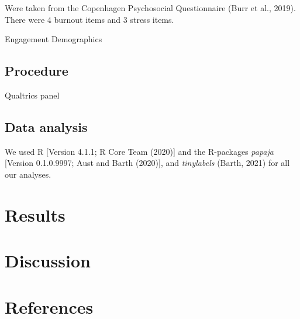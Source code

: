 \documentclass[
  english,
  man]{apa6}
\begin{document}
Were taken from the Copenhagen Psychosocial Questionnaire (Burr et al., 2019). There were 4 burnout items and 3 stress items.

Engagement
Demographics

\hypertarget{procedure}{%
\subsection{Procedure}\label{procedure}}

Qualtrics panel

\hypertarget{data-analysis}{%
\subsection{Data analysis}\label{data-analysis}}

We used R {[}Version 4.1.1; R Core Team (2020){]} and the R-packages \emph{papaja} {[}Version 0.1.0.9997; Aust and Barth (2020){]}, and \emph{tinylabels} (Barth, 2021) for all our analyses.

\hypertarget{results-1}{%
\section{Results}\label{results-1}}

\hypertarget{discussion-1}{%
\section{Discussion}\label{discussion-1}}

\newpage

\hypertarget{references}{%
\section{References}\label{references}}

\begingroup
\setlength{\parindent}{-0.5in}
\setlength{\leftskip}{0.5in}
\end{document}
